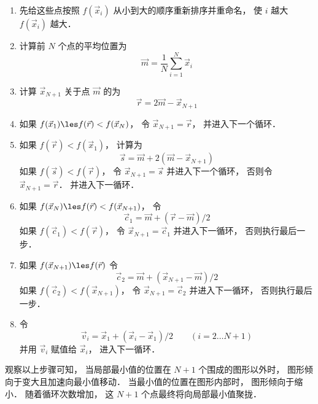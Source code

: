 \begin{enumerate}
\item 先给这些点按照 $f(\vec x_i)$ 从小到大的顺序重新排序并重命名， 使 $i$ 越大 $f(\vec x_i)$ 越大．

\item 计算前 $N$ 个点的平均位置为
\begin{equation}
\vec m = \frac1N \sum_{i=1}^N \vec x_i
\end{equation}

\item 计算 $\vec x_{N + 1}$ 关于点 $\vec m$ 的为
\begin{equation}
\vec r = 2\vec m - \vec x_{N + 1}
\end{equation}

\item 如果 $f(\vec x_1) \les f(\vec r) < f(\vec x_N)$， 令 $\vec x_{N+1} = \vec r$， 并进入下一个循环．

\item 如果 $f(\vec r) < f(\vec x_1)$， 计算为
\begin{equation}
\vec s = \vec m + 2(\vec m - \vec x_{N+1})
\end{equation}
如果 $f(\vec s) < f(\vec r)$， 令 $\vec x_{N+1} = \vec s$ 并进入下一个循环， 否则令 $\vec x_{N+1} = \vec r$． 并进入下一循环．

\item 如果 $f(\vec x_N) \les f(\vec r) < f(\vec x_{N+1})$， 令
\begin{equation}
\vec c_1 = \vec m + (\vec r - \vec m)/2
\end{equation}
如果 $f(\vec c_1) < f(\vec r)$， 令 $\vec x_{N + 1} = \vec c_1$ 并进入下一循环， 否则执行最后一步．

\item 如果 $f(\vec x_{N+1}) \les f(\vec r)$ 令
\begin{equation}
\vec c_2 = \vec m + (\vec x_{N+1} - \vec m)/2
\end{equation}
如果 $f(\vec c_2) < f(\vec x_{N+1})$， 令 $\vec x_{N+1}  = \vec c_2$ 并进入下一循环， 否则执行最后一步．

\item 令
\begin{equation}
\vec v_i = \vec x_1 + (\vec x_i - \vec x_1)/2 \qquad (i = 2\dots N+1)
\end{equation}
并用 $\vec v_i$ 赋值给 $\vec x_i$， 进入下一循环．
\end{enumerate}

观察以上步骤可知， 当局部最小值的位置在 $N+1$ 个围成的图形以外时， 图形倾向于变大且加速向最小值移动． 当最小值的位置在图形内部时， 图形倾向于缩小． 随着循环次数增加， 这 $N+1$ 个点最终将向局部最小值聚拢． 

